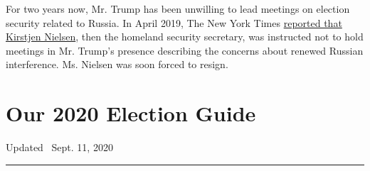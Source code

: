 For two years now, Mr. Trump has been unwilling to lead meetings on
election security related to Russia. In April 2019, The New York Times
\href{https://www.nytimes3xbfgragh.onion/2019/04/24/us/politics/russia-2020-election-trump.html}{reported
that Kirstjen Nielsen}, then the homeland security secretary, was
instructed not to hold meetings in Mr. Trump's presence describing the
concerns about renewed Russian interference. Ms. Nielsen was soon forced
to resign.

\hypertarget{our-2020-election-guide}{%
\section{Our 2020 Election Guide}\label{our-2020-election-guide}}

Updated ~Sept. 11, 2020

\begin{center}\rule{0.5\linewidth}{\linethickness}\end{center}

